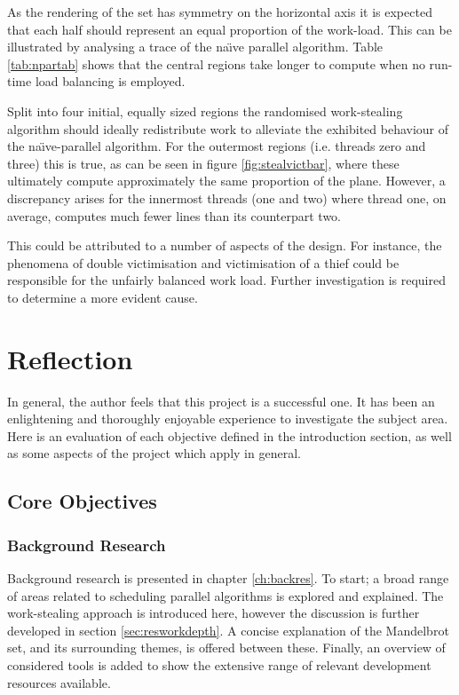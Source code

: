 \begin{itemize}
    As the rendering of the set has symmetry on the horizontal axis it is expected that each half should represent an equal 
    proportion of the work-load. 
    This can be illustrated by analysing a trace of the na\"{\i}ve parallel algorithm. Table \ref{tab:npartab} shows that the 
    central regions take longer to compute when no run-time load balancing is employed.
    
    Split into four initial, equally sized regions the randomised work-stealing algorithm should ideally redistribute work 
    to alleviate the exhibited behaviour of the na\"{\i}ve-parallel algorithm.
    For the outermost regions (i.e. threads zero and three) this is true, as can be seen in figure \ref{fig:stealvictbar},
    where these ultimately compute approximately the same proportion of the plane.
    However, a discrepancy arises for the innermost threads (one and two) where thread one, on average, computes much fewer lines
    than its counterpart two. 

    This could be attributed to a number of aspects of the design. For instance, the phenomena of double victimisation and 
    victimisation of a thief could be responsible for the unfairly balanced work load. Further investigation is
    required to determine a more evident cause.
        
\end{itemize}

\section{Reflection}

In general, the author feels that this project is a successful one. It has been an enlightening and thoroughly enjoyable experience
to investigate the subject area. Here is an evaluation of each objective defined in the introduction section, as well as some aspects 
of the project which apply in general.

\subsection{Core Objectives}
\subsubsection*{Background Research}
    Background research is presented in chapter \ref{ch:backres}. To start; a broad range of areas related to scheduling parallel algorithms is explored 
    and explained. The work-stealing approach is introduced here, however the discussion is further developed in section \ref{sec:resworkdepth}. 
    A concise explanation of the Mandelbrot set, and its surrounding themes, is offered between these. 
    Finally, an overview of considered tools is added to show the extensive range of relevant development resources available.
    
